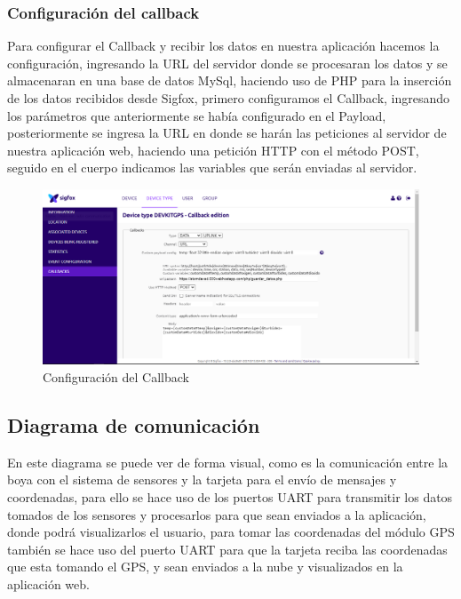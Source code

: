\documentclass[12pt]{book}
\begin{document}
\vspace{5cm}


\subsubsection{Configuración del callback}
Para configurar el Callback y recibir los datos en nuestra aplicación hacemos la configuración, ingresando la URL del servidor donde se procesaran los datos y se almacenaran en una base de datos MySql, haciendo uso de PHP para la inserción de los datos recibidos desde Sigfox, primero configuramos el Callback, ingresando los parámetros que anteriormente se había configurado en el Payload, posteriormente se ingresa la URL en donde se harán las peticiones al servidor de nuestra aplicación web, haciendo una petición HTTP con el método POST, seguido en el cuerpo indicamos las variables que serán enviadas al servidor.

\begin{figure}[bh!]
	\centering
	\includegraphics[width=0.8\linewidth]{imagenes/callback}
	\caption{Configuración del Callback}
	\label{fig:Configuración del Callback}
\end{figure}

\subsection{Diagrama de comunicación}

En este diagrama se puede ver de forma visual, como es la comunicación entre la boya con el sistema de sensores y la tarjeta para el envío de mensajes y coordenadas, para ello se hace uso de los puertos UART para transmitir los datos tomados de los sensores y procesarlos para que sean enviados a la aplicación, donde podrá visualizarlos el usuario, para tomar las coordenadas del módulo GPS también se hace uso del puerto UART para que la tarjeta reciba las coordenadas que esta tomando el GPS, y sean enviados a la nube y visualizados en la aplicación web. 
\end{document}
